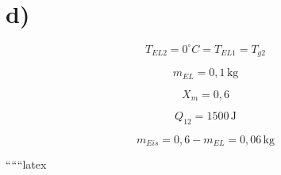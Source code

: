 

\section*{d)}

\[
T_{EL2} = 0^\circ C = T_{EL1} = T_{g2}
\]

\[
m_{EL} = 0,1 \, \text{kg}
\]

\[
X_m = 0,6
\]

\[
Q_{12} = 1500 \, \text{J}
\]

\[
m_{Eis} = 0,6 - m_{EL} = 0,06 \, \text{kg}
\]

``````latex